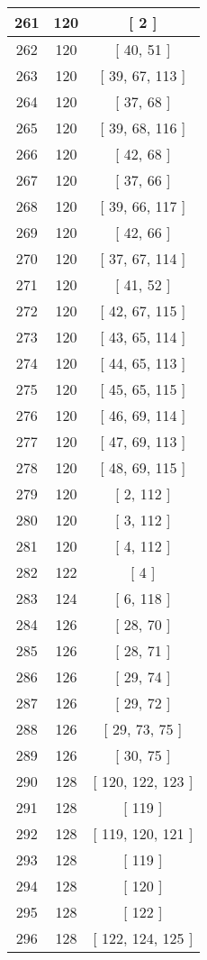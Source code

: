 \begin{center}
\begin{longtable}[H]{|| c c c ||}
261 & 120 & [ 2 ]
\\\hline
262 & 120 & [ 40, 51 ]
\\\hline
263 & 120 & [ 39, 67, 113 ]
\\\hline
264 & 120 & [ 37, 68 ]
\\\hline
265 & 120 & [ 39, 68, 116 ]
\\\hline
266 & 120 & [ 42, 68 ]
\\\hline
267 & 120 & [ 37, 66 ]
\\\hline
268 & 120 & [ 39, 66, 117 ]
\\\hline
269 & 120 & [ 42, 66 ]
\\\hline
270 & 120 & [ 37, 67, 114 ]
\\\hline
271 & 120 & [ 41, 52 ]
\\\hline
272 & 120 & [ 42, 67, 115 ]
\\\hline
273 & 120 & [ 43, 65, 114 ]
\\\hline
274 & 120 & [ 44, 65, 113 ]
\\\hline
275 & 120 & [ 45, 65, 115 ]
\\\hline
276 & 120 & [ 46, 69, 114 ]
\\\hline
277 & 120 & [ 47, 69, 113 ]
\\\hline
278 & 120 & [ 48, 69, 115 ]
\\\hline
279 & 120 & [ 2, 112 ]
\\\hline
280 & 120 & [ 3, 112 ]
\\\hline
281 & 120 & [ 4, 112 ]
\\\hline
282 & 122 & [ 4 ]
\\\hline
283 & 124 & [ 6, 118 ]
\\\hline
284 & 126 & [ 28, 70 ]
\\\hline
285 & 126 & [ 28, 71 ]
\\\hline
286 & 126 & [ 29, 74 ]
\\\hline
287 & 126 & [ 29, 72 ]
\\\hline
288 & 126 & [ 29, 73, 75 ]
\\\hline
289 & 126 & [ 30, 75 ]
\\\hline
290 & 128 & [ 120, 122, 123 ]
\\\hline
291 & 128 & [ 119 ]
\\\hline
292 & 128 & [ 119, 120, 121 ]
\\\hline
293 & 128 & [ 119 ]
\\\hline
294 & 128 & [ 120 ]
\\\hline
295 & 128 & [ 122 ]
\\\hline
296 & 128 & [ 122, 124, 125 ]

\end{longtable}
\end{center}

